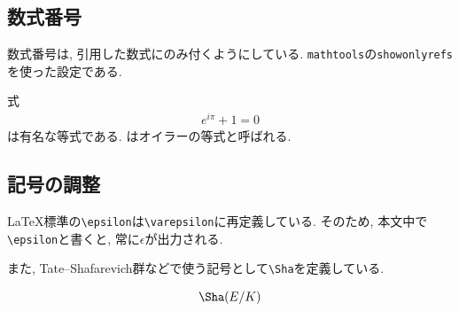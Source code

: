 \documentclass[../main.tex]{subfiles}
\begin{document}
\subsection{数式番号}

数式番号は, 引用した数式にのみ付くようにしている. 
\texttt{mathtools}の\texttt{showonlyrefs}を使った設定である. 

\begin{ex}{}{}
	式
	\begin{align}
		e^{i\pi}+1=0 \label{Euler}
	\end{align}
	は有名な等式である. はオイラーの等式と呼ばれる.
\end{ex}

\subsection{記号の調整}

\LaTeX 標準の\verb|\epsilon|は\verb|\varepsilon|に再定義している. 
そのため, 本文中で\verb|\epsilon|と書くと, 常に$\epsilon$が出力される. 

また, Tate--Shafarevich群などで使う記号として\verb|\Sha|を定義している. 
\begin{ex}{}{}
	\begin{align}
		\Sha(E/K)
	\end{align}
\end{ex}
\end{document}
